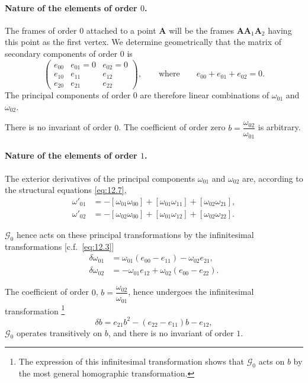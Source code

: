 \documentclass[leqno,11pt]{book}
\numberwithin{equation}{chapter}
\theoremstyle{shape1}
\theoremstyle{shapesmall}
\begin{document}
\paragraph{Nature of the elements of order $0$.}
\label{sec:174}
The frames of order $0$ attached to a point $\mathbf{A}$ will be the frames $\mathbf{AA}_{1}\mathbf{A}_{2}$ having this point as the first vertex. We determine geometrically that the matrix of secondary components of order $0$ is
\[
\begin{pmatrix}
  e_{00}&e_{01}=0&e_{02}=0\\
  e_{10}&e_{11}&e_{12}\\
  e_{20}&e_{21}&e_{22}
\end{pmatrix},
\qquad\text{where}\qquad e_{00}+e_{01}+e_{02}=0.
\]
The principal components of order $0$ are therefore linear combinations of $\omega_{01}$ and $\omega_{02}$.

There is no invariant of order $0$. The coefficient of order zero $b=\dfrac{\omega_{02}}{\omega_{01}}$ is arbitrary. 


\paragraph{Nature of the elements of order $1$.}
\label{sec:175}
The exterior derivatives of the principal components $\omega_{01}$ and $\omega_{02}$ are, according to the structural equations \eqref{eq:12.7},
\begin{align*}
  \omega'_{01}&=-[\omega_{01}\omega_{00}]+[\omega_{01}\omega_{11}]+[\omega_{02}\omega_{21}],\\
  \omega'_{02}&=-[\omega_{02}\omega_{00}]+[\omega_{01}\omega_{12}]+[\omega_{02}\omega_{22}].
\end{align*}

$\mathcal{G}_{0}$ hence acts on these principal transformations by the infinitesimal transformations [c.f.~\eqref{eq:12.3}]
\begin{align*}
  \delta\omega_{01}&=\omega_{01}(e_{00}-e_{11})-\omega_{02}e_{21},\\
  \delta\omega_{02}&=-\omega_{01}e_{12}+\omega_{02}(e_{00}-e_{22}).
\end{align*}

The coefficient of order $0$, $b=\dfrac{\omega_{02}}{\omega_{01}}$, hence undergoes the infinitesimal transformation \footnote{The expression of this infinitesimal transformation shows that $\mathcal{G}_{0}$ acts on $b$ by the most general homographic transformation.}
\[
\delta b=e_{21}b^{2}-(e_{22}-e_{11})b-e_{12},
\]
$\mathcal{G}_{0}$ operates transitively on $b$, and there is no invariant of order $1$.
\end{document}
